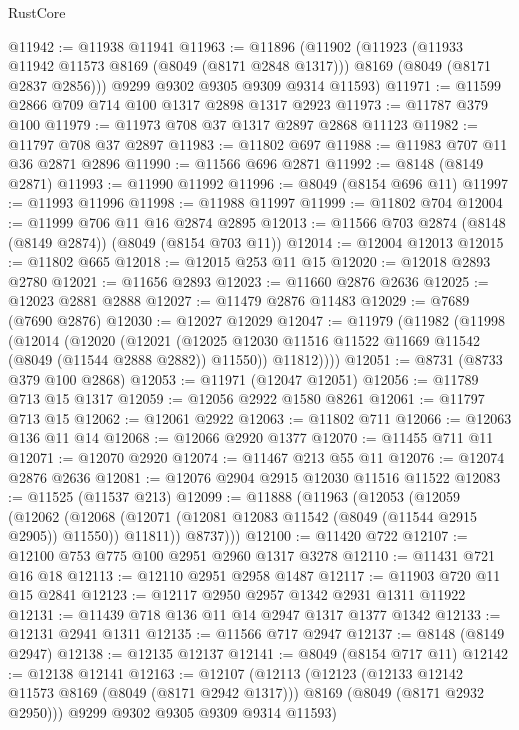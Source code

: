 \begin{lexlean}{RustCore}
\begin{coremodule}
@11942 := @11938 @11941
@11963 := @11896
    (@11902
      (@11923
        (@11933 @11942 @11573 @8169 (@8049 (@8171 @2848 @1317)))
        @8169
        (@8049 (@8171 @2837 @2856)))
      @9299
      @9302
      @9305
      @9309
      @9314
      @11593)
@11971 := @11599 @2866 @709 @714 @100 @1317 @2898 @1317 @2923
@11973 := @11787 @379 @100
@11979 := @11973 @708 @37 @1317 @2897 @2868 @11123
@11982 := @11797 @708 @37 @2897
@11983 := @11802 @697
@11988 := @11983 @707 @11 @36 @2871 @2896
@11990 := @11566 @696 @2871
@11992 := @8148 (@8149 @2871)
@11993 := @11990 @11992
@11996 := @8049 (@8154 @696 @11)
@11997 := @11993 @11996
@11998 := @11988 @11997
@11999 := @11802 @704
@12004 := @11999 @706 @11 @16 @2874 @2895
@12013 := @11566 @703 @2874 (@8148 (@8149 @2874)) (@8049 (@8154 @703 @11))
@12014 := @12004 @12013
@12015 := @11802 @665
@12018 := @12015 @253 @11 @15
@12020 := @12018 @2893 @2780
@12021 := @11656 @2893
@12023 := @11660 @2876 @2636
@12025 := @12023 @2881 @2888
@12027 := @11479 @2876 @11483
@12029 := @7689 (@7690 @2876)
@12030 := @12027 @12029
@12047 := @11979
    (@11982
      (@11998
        (@12014
          (@12020
            (@12021 (@12025 @12030 @11516 @11522 @11669 @11542 (@8049 (@11544 @2888 @2882)) @11550))
            @11812))))
@12051 := @8731 (@8733 @379 @100 @2868)
@12053 := @11971 (@12047 @12051)
@12056 := @11789 @713 @15 @1317
@12059 := @12056 @2922 @1580 @8261
@12061 := @11797 @713 @15
@12062 := @12061 @2922
@12063 := @11802 @711
@12066 := @12063 @136 @11 @14
@12068 := @12066 @2920 @1377
@12070 := @11455 @711 @11
@12071 := @12070 @2920
@12074 := @11467 @213 @55 @11
@12076 := @12074 @2876 @2636
@12081 := @12076 @2904 @2915 @12030 @11516 @11522
@12083 := @11525 (@11537 @213)
@12099 := @11888
    (@11963
      (@12053
        (@12059
          (@12062
            (@12068 (@12071 (@12081 @12083 @11542 (@8049 (@11544 @2915 @2905)) @11550)) @11811))
          @8737)))
@12100 := @11420 @722
@12107 := @12100 @753 @775 @100 @2951 @2960 @1317 @3278
@12110 := @11431 @721 @16 @18
@12113 := @12110 @2951 @2958 @1487
@12117 := @11903 @720 @11 @15 @2841
@12123 := @12117 @2950 @2957 @1342 @2931 @1311 @11922
@12131 := @11439 @718 @136 @11 @14 @2947 @1317 @1377 @1342
@12133 := @12131 @2941 @1311
@12135 := @11566 @717 @2947
@12137 := @8148 (@8149 @2947)
@12138 := @12135 @12137
@12141 := @8049 (@8154 @717 @11)
@12142 := @12138 @12141
@12163 := @12107
    (@12113
      (@12123
        (@12133 @12142 @11573 @8169 (@8049 (@8171 @2942 @1317)))
        @8169
        (@8049 (@8171 @2932 @2950)))
      @9299
      @9302
      @9305
      @9309
      @9314
      @11593)

\end{coremodule}
\end{lexlean}
